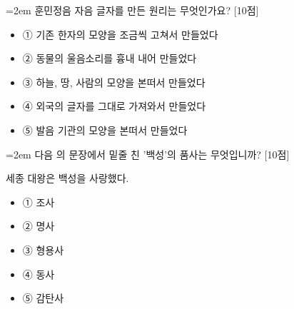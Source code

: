 \documentclass[12pt,a4paper]{article}
\newcommand{\qnum}[1]{%
  \tikz[baseline=(num.base)]{%
    \node[circle, fill=numCircle, text=white, inner sep=0pt,
          minimum size=18pt, font=\small\bfseries] (num) {#1};%
  }%
}
\newcommand{\pts}[1]{%
  \hfill\textcolor{ptsBadge}{[#1점]}%
}
\begin{document}
\vspace{4mm}
\begin{minipage}{\columnwidth}
{\hangindent=2em
\qnum{42}\enspace 훈민정음 자음 글자를 만든 원리는 무엇인가요? \pts{10}
\par}

\vspace{3mm}
\begin{itemize}[leftmargin=2.5em, labelsep=0.3em, label={}, itemsep=4pt, parsep=1pt, topsep=0pt]
  \item ① 기존 한자의 모양을 조금씩 고쳐서 만들었다
  \item ② 동물의 울음소리를 흉내 내어 만들었다
  \item ③ 하늘, 땅, 사람의 모양을 본떠서 만들었다
  \item ④ 외국의 글자를 그대로 가져와서 만들었다
  \item ⑤ 발음 기관의 모양을 본떠서 만들었다
\end{itemize}
\end{minipage}
\vspace{4mm}

\vspace{4mm}
\begin{minipage}{\columnwidth}
{\hangindent=2em
\qnum{43}\enspace 다음 의 문장에서 밑줄 친 '백성'의 품사는 무엇입니까? \pts{10}
\par}

\vspace{3mm}
\begin{tcolorbox}[bogi]
세종 대왕은 백성을 사랑했다.
\end{tcolorbox}
\vspace{3mm}
\begin{itemize}[leftmargin=2.5em, labelsep=0.3em, label={}, itemsep=4pt, parsep=1pt, topsep=0pt]
  \item ① 조사
  \item ② 명사
  \item ③ 형용사
  \item ④ 동사
  \item ⑤ 감탄사
\end{itemize}
\end{minipage}
\vspace{4mm}
\end{document}

